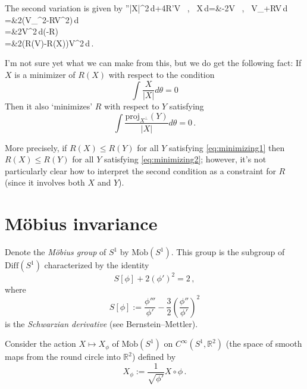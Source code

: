 \documentclass[12pt,reqno]{amsart}
\newcommand{\R}{\ensuremath{\mathbb{R}}}
\newcommand{\proj}{\mathrm{proj}}
\newcommand{\inner}[2]{\left\langle #1 \, , \, #2\right\rangle} %
\newcommand{\norm}[1]{\left\Vert#1\right\Vert} %
\newcommand{\lb}{\left(}
\newcommand{\rb}{\right)}
\def\bann #1\eann {\begin{align*} #1\end{align*}}
\theoremstyle{plain}
\numberwithin{equation}{section}
\theoremstyle{remark}
\begin{document}
The second variation is given by
\bann
R''\int |X|^2\,d\theta+4R'\int \inner{V}{X}\,d\theta={}&-2\int \inner{V}{V_{\theta\theta}+RV}\,d\theta\\
={}&2\int\lb \norm{V_{\theta}}^2-R\norm{V}^2\rb\,d\theta\\
={}&2\int \norm{V}^2\,d\theta\lb\frac{\int \norm{V_{\theta}}^2\,d\theta}{\int \norm{V}^2\,d\theta}-R\rb\\
={}&2\lb R(V)-R(X)\rb\int \norm{V}^2\,d\theta\,.
\eann

I'm not sure yet what we can make from this, but we do get the following fact: If $X$ is a minimizer of $R(X)$ with respect to the condition 
\begin{equation}\label{eq:minimizing1}
\int \frac{X}{|X|}d\theta=0
\end{equation}
Then it also `minimizes' $R$ with respect to $Y$ satisfying
\begin{equation}\label{eq:minimizing2}
\int \frac{\proj_{X^{\perp}}(Y)}{|X|}d\theta=0\,.
\end{equation}

More precisely, if $R(X)\leq R(Y)$ for all $Y$ satisfying \eqref{eq:minimizing1} then $R(X)\leq R(Y)$ for all $Y$ satisfying \eqref{eq:minimizing2}; however, it's not particularly clear how to interpret the second condition as a constraint for $R$ (since it involves both $X$ and $Y$).


\section{M\"obius invariance}

Denote the \emph{M\"obius group} of $S^1$ by $\mathrm{M\ddot ob}(S^1)$. This group is the subgroup of $\mathrm{Diff}(S^1)$ characterized by the identity
\[
S[\phi]+2(\phi')^2=2\,,
\]
where
\[
S[\phi]:=\frac{\phi'''}{\phi'}-\frac{3}{2}\lb\frac{\phi''}{\phi'}\rb^2
\]
is the \emph{Schwarzian derivative} (see Bernstein--Mettler).

Consider the action $X\mapsto X_\phi$ of $\mathrm{M\ddot ob}(S^1)$ on $C^\infty(S^1,\R^2)$ (the space of smooth maps from the round circle into $\R^2$) defined by
\[
X_\phi:=\frac{1}{\sqrt{\phi'}}X\circ\phi\,.
\]
\end{document}
